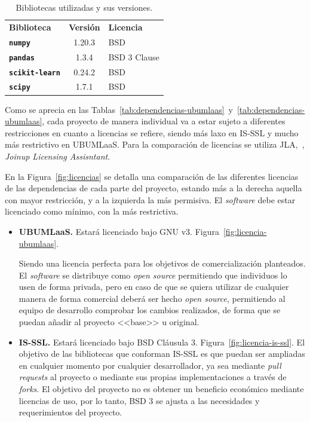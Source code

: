 \begin{table}[]
\centering
\begin{tabular}{lcl}
	\toprule
	\textbf{Biblioteca} & \textbf{Versión} & \textbf{Licencia}\\ \rowcolor[HTML]{EFEFEF} 
	\midrule
	\rowcolor[HTML]{EFEFEF} 
	\textbf{\texttt{numpy}}    & 1.20.3 &  BSD \\ \rowcolor[HTML]{EFEFEF} 
	\textbf{\texttt{pandas}}    & 1.3.4  & BSD 3 Clause  \\  
	\textbf{\texttt{scikit-learn}}    & 0.24.2 & BSD  \\ \rowcolor[HTML]{EFEFEF} 
	\textbf{\texttt{scipy}}    & 1.7.1  & BSD   \\ 
	\bottomrule
\end{tabular}
\caption{Bibliotecas utilizadas y sus versiones.}\label{tab:dependencias-is-ssl}
\end{table}

Como se aprecia en las Tablas~\ref{tab:dependencias-ubumlaas}~y~\ref{tab:dependencias-ubumlaas}, cada proyecto de manera individual va a estar sujeto a diferentes restricciones en cuanto a licencias se refiere, siendo más laxo en IS-SSL y mucho más restrictivo en UBUMLaaS. Para la comparación de licencias se utiliza JLA,~\cite{JLA}, \textit{Joinup Licensing Assisntant}.


En la Figura~\ref{fig:licencias} se detalla una comparación de las diferentes licencias de las dependencias de cada parte del proyecto, estando más a la derecha aquella con mayor restricción, y a la izquierda la más permisiva. El \textit{software} debe estar licenciado como mínimo, con la más restrictiva.

\begin{itemize}
\item \textbf{UBUMLaaS.} Estará licenciado bajo GNU v3.  Figura~\ref{fig:licencia-ubumlaas}. 

Siendo una licencia perfecta para los objetivos de comercialización planteados. El \textit{software} se distribuye como \textit{open source} permitiendo que individuos lo usen de forma privada, pero en caso de que se quiera utilizar de cualquier manera de forma comercial deberá ser hecho \textit{open source}, permitiendo al equipo de desarrollo comprobar los cambios realizados, de forma que se puedan añadir al proyecto <<base>> u original.

\item \textbf{IS-SSL.} Estará licenciado bajo BSD Cláusula 3.  Figura~\ref{fig:licencia-is-ssl}.  El objetivo de las bibliotecas que conforman IS-SSL es que puedan ser ampliadas en cualquier momento por cualquier desarrollador, ya sea mediante \textit{pull requests} al proyecto o mediante sus propias implementaciones a través de \textit{forks}.  El objetivo del proyecto no es obtener un beneficio económico mediante licencias de uso, por lo tanto, BSD 3 se ajusta a las necesidades y requerimientos del proyecto.
\end{itemize}

